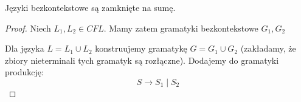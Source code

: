 \begin{theorem}
	Języki bezkontekstowe są zamknięte na sumę.
\end{theorem}
\begin{proof}
	Niech \( L_1, L_2 \in CFL \). Mamy zatem gramatyki bezkontekstowe \( G_1, G_2 \)

	Dla języka \( L = L_1 \cup L_2 \) konstruujemy gramatykę \( G = G_1 \cup G_2 \) (zakładamy, że zbiory nieterminali tych gramatyk są rozłączne).
	Dodajemy do gramatyki produkcję:
	\[
		S \rightarrow S_1 \mid S_2
	\]
\end{proof}